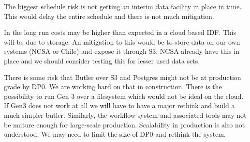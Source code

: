 The biggest schedule risk is not getting an interim data facility in place in time.
This would delay the entire schedule and there is not much mitigation.

In the long run costs may be higher than expected in a cloud based IDF. This will be due to storage.
An mitigation to this would be to store data on our own systems (NCSA or Chile) and expose it through S3.
NCSA already have this in place and we should consider testing this for lesser used data sets.

There is some risk that  Butler over S3 and Postgres  might not be at  production grade by DP0. We are working hard on that in construction. There is the possibility to run Gen 3 over a filesystem which would not be ideal on the cloud. If Gen3 does not work at all we will have to have a major rethink and build a much simpler butler.
Similarly, the workflow system and associated tools may not be mature enough for large-scale production. Scalability in production is also not understood. We may need to limit the size of DP0 and rethink the system.
